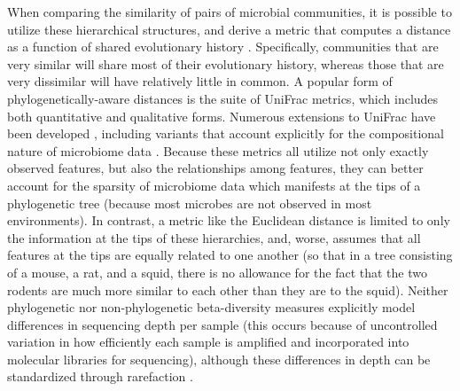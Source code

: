 When comparing the similarity of pairs of microbial communities, it is possible to utilize these hierarchical structures, and derive a metric that computes a distance as a function of shared evolutionary history \cite{Lozupone2005-aj}. Specifically, communities that are very similar will share most of their evolutionary history, whereas those that are very dissimilar will have relatively little in common. A popular form of phylogenetically-aware distances is the suite of UniFrac metrics, which includes both quantitative \cite{Lozupone2007-gw} and qualitative \cite{Lozupone2005-aj} forms. Numerous extensions to UniFrac have been developed \cite{Chen2012-ti,Chang2011-gt}, including variants that account explicitly for the compositional nature of microbiome data \cite{Wong2016-sx}. Because these metrics all utilize not only exactly observed features, but also the relationships among features, they can better account for the sparsity of microbiome data which manifests at the tips of a phylogenetic tree (because most microbes are not observed in most environments). In contrast, a metric like the Euclidean distance is limited to only the information at the tips of these hierarchies, and, worse, assumes that all features at the tips are equally related to one another (so that in a tree consisting of a mouse, a rat, and a squid, there is no allowance for the fact that the two rodents are much more similar to each other than they are to the squid). Neither phylogenetic nor non-phylogenetic beta-diversity measures explicitly model differences in sequencing depth per sample (this occurs because of uncontrolled variation in how efficiently each sample is amplified and incorporated into molecular libraries for sequencing), although these differences in depth can be standardized through rarefaction \cite{Weiss2017-iv}. 

